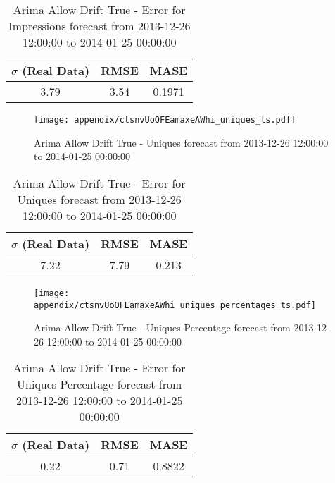 \begin{table}[H]
\centering
\footnotesize
\begin{tabular}{ccc}
$\sigma$ (Real Data) & RMSE & MASE   \\ \hline
3.79 & 3.54 & 0.1971 \\
\end{tabular}

\vspace{0.5cm}

\caption{
Arima Allow Drift True - Error for Impressions forecast from 2013-12-26 12:00:00 to 2014-01-25 00:00:00}
\end{table}

\begin{figure}[H] \begin{center} \leavevmode
\texttt{[image: appendix/ctsnvUoOFEamaxeAWhi\_uniques\_ts.pdf]} \caption{
Arima Allow Drift True - Uniques forecast from 2013-12-26 12:00:00 to 2014-01-25 00:00:00} \label{fig:appendix/ctsnvUoOFEamaxeAWhi_uniques_ts.pdf} \end{center}
\end{figure}

\begin{table}[H]
\centering
\footnotesize
\begin{tabular}{ccc}
$\sigma$ (Real Data) & RMSE & MASE   \\ \hline
7.22 & 7.79 & 0.213 \\
\end{tabular}

\vspace{0.5cm}

\caption{
Arima Allow Drift True - Error for Uniques forecast from 2013-12-26 12:00:00 to 2014-01-25 00:00:00}
\end{table}

\begin{figure}[H] \begin{center} \leavevmode
\texttt{[image: appendix/ctsnvUoOFEamaxeAWhi\_uniques\_percentages\_ts.pdf]} \caption{
Arima Allow Drift True - Uniques Percentage forecast from 2013-12-26 12:00:00 to 2014-01-25 00:00:00} \label{fig:appendix/ctsnvUoOFEamaxeAWhi_uniques_percentages_ts.pdf} \end{center}
\end{figure}

\begin{table}[H]
\centering
\footnotesize
\begin{tabular}{ccc}
$\sigma$ (Real Data) & RMSE & MASE   \\ \hline
0.22 & 0.71 & 0.8822 \\
\end{tabular}

\vspace{0.5cm}

\caption{
Arima Allow Drift True - Error for Uniques Percentage forecast from 2013-12-26 12:00:00 to 2014-01-25 00:00:00}
\end{table}


